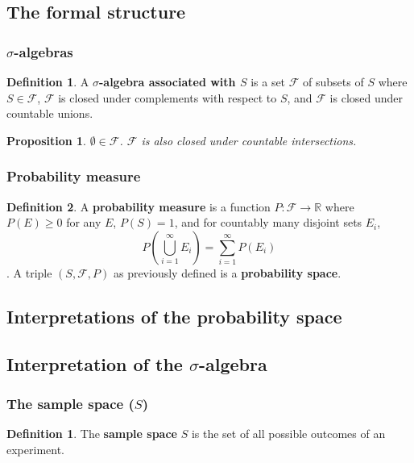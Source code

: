 \documentclass[12pt]{article}
\newtheorem*{prop*}{Proposition}
\theoremstyle{definition}
\newtheorem{defn}{Definition}[subsection]
\newtheorem*{defn*}{Definition}
\newcommand{\R}{\mathbb{R}}
\newcommand{\F}{\mathcal{F}}
\begin{document}
\subsection{The formal structure}

\subsubsection{$\sigma$-algebras}

\begin{defn}
  A \textbf{$\sigma$-algebra associated with $S$} is a set $\F$ of subsets of $S$ where $S \in \F$, $\F$ is closed under complements with respect to $S$, and $\F$ is closed under countable unions.
\end{defn}

\begin{prop*}
  $\emptyset \in \F$. $\F$ is also closed under countable intersections.
\end{prop*}

\subsubsection{Probability measure}

\begin{defn}
  A \textbf{probability measure} is a function $P : \F \to \R$ where $P(E) \geq 0$ for any $E$, $P(S) = 1$, and for countably many disjoint sets $E_i$,
  $$P\left(\bigcup_{i = 1}^{\infty}E_i\right) = \sum_{i = 1}^{\infty}P(E_i)$$.
  A triple $(S, \F, P)$ as previously defined is a \textbf{probability space}.
\end{defn}

\subsection{Interpretations of the probability space}

\subsection{Interpretation of the $\sigma$-algebra}

\subsubsection{The sample space ($S$)}

\begin{defn*}
  The \textbf{sample space} $S$ is the set of all possible outcomes of an experiment.
\end{defn*}
\end{document}
